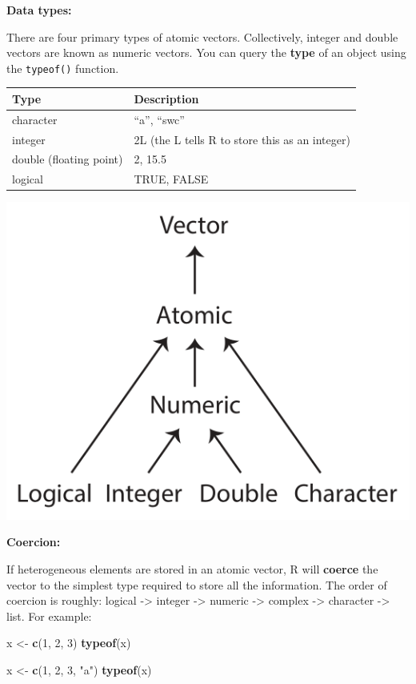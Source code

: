 \documentclass[]{book}
\newenvironment{Shaded}{\begin{snugshade}}{\end{snugshade}}
\newcommand{\DecValTok}[1]{\textcolor[rgb]{0.00,0.00,0.81}{#1}}
\newcommand{\KeywordTok}[1]{\textcolor[rgb]{0.13,0.29,0.53}{\textbf{#1}}}
\newcommand{\NormalTok}[1]{#1}
\newcommand{\StringTok}[1]{\textcolor[rgb]{0.31,0.60,0.02}{#1}}
\begin{document}
\textbf{Data types:}

There are four primary types of atomic vectors. Collectively, integer and double vectors are known as numeric vectors. You can query the \textbf{type} of an object using the \texttt{typeof()} function.

\begin{longtable}[]{@{}ll@{}}
\toprule
Type & Description\tabularnewline
\midrule
\endhead
character & ``a'', ``swc''\tabularnewline
integer & 2L (the L tells R to store this as an integer)\tabularnewline
double (floating point) & 2, 15.5\tabularnewline
logical & TRUE, FALSE\tabularnewline
\bottomrule
\end{longtable}

\includegraphics{R/RDataWrangling/images/summary_tree_atomic.png}

\textbf{Coercion:}

If heterogeneous elements are stored in an atomic vector, R will \textbf{coerce} the vector to the simplest type required to store all the information. The order of coercion is roughly: logical -\textgreater{} integer -\textgreater{} numeric -\textgreater{} complex -\textgreater{} character -\textgreater{} list. For example:

\begin{Shaded}
\begin{Highlighting}[]
\NormalTok{x <-}\StringTok{ }\KeywordTok{c}\NormalTok{(}\DecValTok{1}\NormalTok{, }\DecValTok{2}\NormalTok{, }\DecValTok{3}\NormalTok{)}
\KeywordTok{typeof}\NormalTok{(x)}

\NormalTok{x <-}\StringTok{ }\KeywordTok{c}\NormalTok{(}\DecValTok{1}\NormalTok{, }\DecValTok{2}\NormalTok{, }\DecValTok{3}\NormalTok{, }\StringTok{"a"}\NormalTok{)}
\KeywordTok{typeof}\NormalTok{(x)}
\end{Highlighting}
\end{Shaded}
\end{document}
